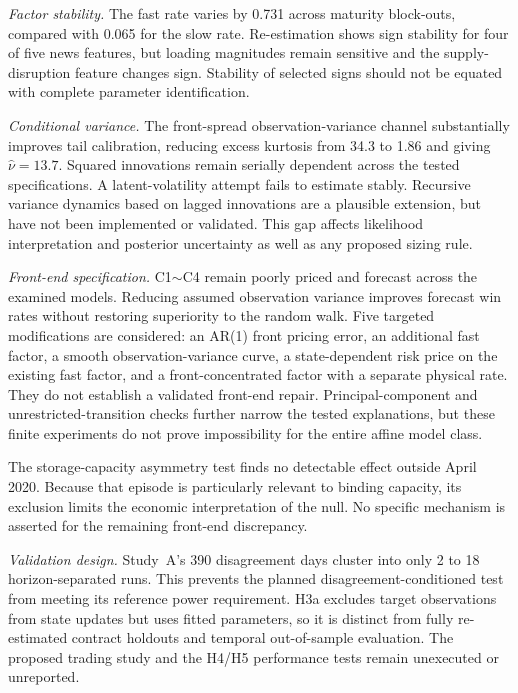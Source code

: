 \documentclass[journal]{IEEEtran}
\newcommand{\rng}{\ensuremath{\sim}}
\begin{document}
\emph{Factor stability.} The fast rate varies by 0.731 across maturity block-outs, compared with 0.065 for the slow rate. Re-estimation shows sign stability for four of five news features, but loading magnitudes remain sensitive and the supply-disruption feature changes sign. Stability of selected signs should not be equated with complete parameter identification.

\emph{Conditional variance.} The front-spread observation-variance channel substantially improves tail calibration, reducing excess kurtosis from 34.3 to 1.86 and giving $\hat\nu=13.7$. Squared innovations remain serially dependent across the tested specifications. A latent-volatility attempt fails to estimate stably. Recursive variance dynamics based on lagged innovations are a plausible extension, but have not been implemented or validated. This gap affects likelihood interpretation and posterior uncertainty as well as any proposed sizing rule.

\emph{Front-end specification.} C1\rng{}C4 remain poorly priced and forecast across the examined models. Reducing assumed observation variance improves forecast win rates without restoring superiority to the random walk. Five targeted modifications are considered: an AR(1) front pricing error, an additional fast factor, a smooth observation-variance curve, a state-dependent risk price on the existing fast factor, and a front-concentrated factor with a separate physical rate. They do not establish a validated front-end repair. Principal-component and unrestricted-transition checks further narrow the tested explanations, but these finite experiments do not prove impossibility for the entire affine model class.

The storage-capacity asymmetry test finds no detectable effect outside April 2020. Because that episode is particularly relevant to binding capacity, its exclusion limits the economic interpretation of the null. No specific mechanism is asserted for the remaining front-end discrepancy.

\emph{Validation design.} Study~A's 390 disagreement days cluster into only 2 to 18 horizon-separated runs. This prevents the planned disagreement-conditioned test from meeting its reference power requirement. H3a excludes target observations from state updates but uses fitted parameters, so it is distinct from fully re-estimated contract holdouts and temporal out-of-sample evaluation. The proposed trading study and the H4/H5 performance tests remain unexecuted or unreported.
\end{document}
